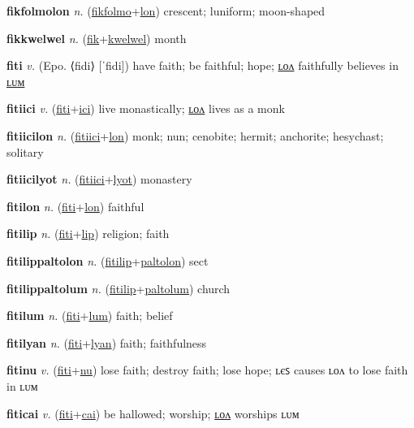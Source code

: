 \textbf{\hypertarget{fikfolmolon}{fikfolmolon}} \textit{n.} (\hyperlink{fikfolmo}{fikfolmo}+\allowbreak \hyperlink{lon}{lon})
crescent; luniform; moon-shaped

\textbf{\hypertarget{fikkwelwel}{fikkwelwel}} \textit{n.} (\hyperlink{fik}{fik}+\allowbreak \hyperlink{kwelwel}{kwelwel})
month

\textbf{\hypertarget{fiti}{fiti}} \textit{v.} (Epo. ⟨fidi⟩ [ˈfidi])
have faith; be faithful; hope; \hyperlink{fitilon}{ʟᴏᴧ} faithfully believes in \hyperlink{fitilum}{ʟᴜᴍ}

\textbf{\hypertarget{fitiici}{fitiici}} \textit{v.} (\hyperlink{fiti}{fiti}+\allowbreak \hyperlink{ici}{ici})
live monastically; \hyperlink{fitiicilon}{ʟᴏᴧ} lives as a monk

\textbf{\hypertarget{fitiicilon}{fitiicilon}} \textit{n.} (\hyperlink{fitiici}{fitiici}+\allowbreak \hyperlink{lon}{lon})
monk; nun; cenobite; hermit; anchorite; hesychast; solitary

\textbf{\hypertarget{fitiicilyot}{fitiicilyot}} \textit{n.} (\hyperlink{fitiici}{fitiici}+\allowbreak \hyperlink{lyot}{lyot})
monastery

\textbf{\hypertarget{fitilon}{fitilon}} \textit{n.} (\hyperlink{fiti}{fiti}+\allowbreak \hyperlink{lon}{lon})
faithful

\textbf{\hypertarget{fitilip}{fitilip}} \textit{n.} (\hyperlink{fiti}{fiti}+\allowbreak \hyperlink{lip}{lip})
religion; faith

\textbf{\hypertarget{fitilippaltolon}{fitilippaltolon}} \textit{n.} (\hyperlink{fitilip}{fitilip}+\allowbreak \hyperlink{paltolon}{paltolon})
sect

\textbf{\hypertarget{fitilippaltolum}{fitilippaltolum}} \textit{n.} (\hyperlink{fitilip}{fitilip}+\allowbreak \hyperlink{paltolum}{paltolum})
church

\textbf{\hypertarget{fitilum}{fitilum}} \textit{n.} (\hyperlink{fiti}{fiti}+\allowbreak \hyperlink{lum}{lum})
faith; belief

\textbf{\hypertarget{fitilyan}{fitilyan}} \textit{n.} (\hyperlink{fiti}{fiti}+\allowbreak \hyperlink{lyan}{lyan})
faith; faithfulness

\textbf{\hypertarget{fitinu}{fitinu}} \textit{v.} (\hyperlink{fiti}{fiti}+\allowbreak \hyperlink{nu}{nu})
lose faith; destroy faith; lose hope; ʟєꜱ causes ʟᴏᴧ to lose faith in ʟᴜᴍ

\textbf{\hypertarget{fiticai}{fiticai}} \textit{v.} (\hyperlink{fiti}{fiti}+\allowbreak \hyperlink{cai}{cai})
be hallowed; worship; \hyperlink{fiticailon}{ʟᴏᴧ} worships ʟᴜᴍ

